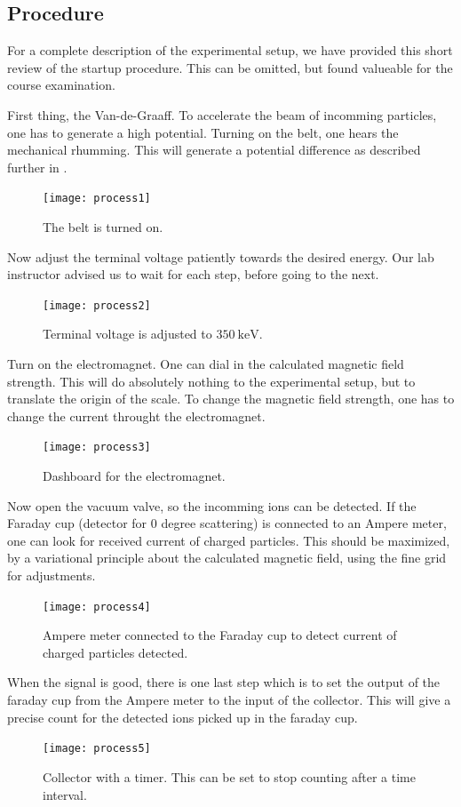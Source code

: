 \clearpage
\subsection{Procedure}\label{sec_procedure}
For a complete description of the experimental setup, we have provided this
short review of the startup procedure. This can be omitted, but found valueable
for the course examination.

First thing, the Van-de-Graaff. To accelerate the beam of incomming particles,
one has to generate a high potential. Turning on the belt, one hears the
mechanical rhumming. This will generate a potential difference as described
further in \cite[p. 565]{krane}.
\begin{figure}[h!]
\centering
\texttt{[image: process1]}
\caption{The belt is turned on.}
\label{fig_process1}
\end{figure}

Now adjust the terminal voltage patiently towards the desired energy. Our lab
instructor advised us to wait for each step, before going to the next.
\begin{figure}[h!]
\centering
\texttt{[image: process2]}
\caption{Terminal voltage is adjusted to $\SI{350}{\kilo\electronvolt}$.}
\label{fig_process2}
\end{figure}

Turn on the electromagnet. One can dial in the calculated magnetic field
strength. This will do absolutely nothing to the experimental setup, but to
translate the origin of the scale. To change the magnetic field strength, one
has to change the current throught the electromagnet.
\begin{figure}[h!]
\centering
\texttt{[image: process3]}
\caption{Dashboard for the electromagnet.}
\label{fig_process3}
\end{figure}

Now open the vacuum valve, so the incomming ions can be detected.
If the Faraday cup (detector for $0$ degree scattering) is connected to an Ampere
meter, one can look for received current of charged particles. This should be
maximized, by a variational principle about the calculated magnetic field,
using the fine grid for adjustments.

\begin{figure}[h!]
\centering
\texttt{[image: process4]}
\caption{Ampere meter connected to the Faraday cup to detect current of charged
particles detected.}
\label{fig_process4}
\end{figure}
When the signal is good, there is one last step which is to set the output of
the faraday cup from the Ampere meter to the input of the collector. This will
give a precise count for the detected ions picked up in the faraday cup.
\begin{figure}[b]
\centering
\texttt{[image: process5]}
\caption{Collector with a timer. This can be set to stop counting after a time
interval.}
\label{fig_process5}
\end{figure}







